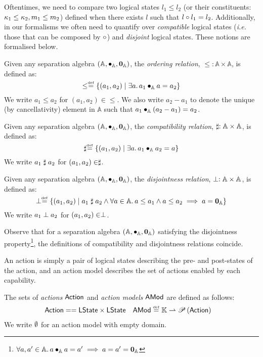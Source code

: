 %
%
Oftentimes, we need to compare two logical states $l_1 \leq l_2$ (or their constituents: $\kappa_{1} \leq \kappa_{2}, m_{1} \leq m_{2}$) defined when there exists $l$ such that $l\circ l_1 = l_2$. Additionally, in our formalisms we often need to quantify over \emph{compatible} logical states (\textit{i.e.} those that can be composed by $\circ$) and \emph{disjoint} logical states. These notions are formalised below. 
%
%
\begin{definition}[Ordering]
Given any separation algebra $(\mathbb{A}, \bullet_{\mathbb{A}}, \mathbf{0}_{\mathbb{A}})$, the \emph{ordering relation}, $\leq : \mathbb{A} \times \mathbb{A}$, is defined as:
%
\[
	\leq \mathrel{\stackrel{\smash{\scriptscriptstyle{\mathrm{def}}}}{=}} \left\{(a_1, a_2) \mid \exists a.\, a_1 \bullet_{\mathbb{A}} a = a_2 \right\}
\]
%
We write $a_1 \leq a_2$ for $(a_1, a_2) \in \leq$. We also write $a_2 - a_1$ to denote the unique (by cancellativity) element in $\mathbb{A}$ such that $a_1 \bullet_{\mathbb{A}} (a_2 - a_1) = a_2$.
%
\end{definition}
%
%
\begin{definition}[Compatibility]
Given any separation algebra $(\mathbb{A}, \bullet_{\mathbb{A}}, \mathbf{0}_{\mathbb{A}})$, the \emph{compatibility relation}, $\mathrel{\sharp} : \mathbb{A} \times \mathbb{A}$, is defined as:
%
\[
	\mathrel{\sharp} \mathrel{\stackrel{\smash{\scriptscriptstyle{\mathrm{def}}}}{=}} \left\{(a_1, a_2) \mid \exists a.\, a_1 \bullet_{\mathbb{A}} a_2 = a \right\}
\]
%
We write $a_1 \mathrel{\sharp} a_2$ for $(a_1, a_2) \in \mathrel{\sharp}$.
\end{definition}
%
%
\begin{definition}[Disjointness]
Given any separation algebra $(\mathbb{A}, \bullet_{\mathbb{A}}, \mathbf{0}_{\mathbb{A}})$, the \emph{disjointness relation}, $\mathrel{\bot} : \mathbb{A} \times \mathbb{A}$, is defined as:
%
\[
	\mathrel{\bot} \mathrel{\stackrel{\smash{\scriptscriptstyle{\mathrm{def}}}}{=}} \left\{(a_1, a_2) \mid a_1 \mathrel{\sharp} a_2 \land \forall a \in \mathbb{A}.\, a \leq a_1 \land a \leq a_2 \implies a = \mathbf{0}_{\mathbb{A}} \right\}
\]
%
We write $a_1 \mathrel{\bot} a_2$ for $(a_1, a_2) \in \mathrel{\bot}$.
\end{definition}
%
%
Observe that for a separation algebra $(\mathbb{A}, \bullet_{\mathbb{A}}, \mathbf{0}_{\mathbb{A}})$ satisfying the disjointness property\footnote{$\forall a, a' \in \mathbb{A}.\, a \bullet_{\mathbb{A}} a = a' \implies a = a' = \mathbf{0}_{\mathbb{A}}$}, the definitions of compatibility and disjointness relations coincide. 

An action is simply a pair of logical states describing the pre- and post-states of the action, and an action model describes the set of actions enabled by each capability.
%
%
\begin{definition}
The sets of \emph{actions} $\mathsf{Action}$ and \emph{action models} $\textsf{AMod}$ are defined as follows:  
%
\begin{align*}
  \set{Action} &== \LStates \times \LStates&
  \AMods &\eqdef \Caps \rightharpoonup \pset{\set{Action}}
  \vspace{-1ex}
\end{align*}
%
We write $\emptyset$ for an action model with empty domain.
\end{definition}
%
%
